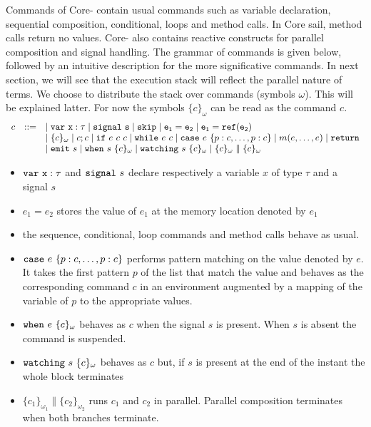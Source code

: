 \documentclass[12pt]{article}
\def\sig{s}
\def\signal{{\tt{signal}}}
\def\variable{\tt{var}}
\def\allocate{{\tt{ref}}}
\def\case{{\tt{case}}}
\newcommand{\ite}[3]{{\tt{if}}~#1~#2~#3}
\newcommand{\while}[2]{{\tt{while}}~#1~#2}
\def\emit{{\tt{emit}}}
\newcommand{\when}[2]{{\tt{when}}~#1~#2}
\newcommand{\watching}[2]{{\tt{watching}}~#1~#2}
\def\sail{{\sc{sail}}}
\def\skipp{{\tt{skip}}}
\def\return{{\tt{return}}}
\newcommand{\block}[2]{\{#1\}_{#2}}
\begin{document}
Commands of Core-\sail{} contain usual commands such as variable declaration, sequential composition, 
conditional, loops and method calls. In Core sail, method calls return no values.
Core-\sail{} also contains reactive constructs for parallel composition and signal handling.
The grammar of commands is given below, followed by an intuitive description for the more significative commands.
In next section, we will see that the execution stack will reflect the parallel nature of terms. We choose
to distribute the stack over commands (symbols $\omega$). This will be explained latter.
For now the symbols $\{c\}_\omega$ can be read as the command $c$.
$$
\begin{array}{lcl}
  c &::=& \mid \variable~x:\tau \mid \signal~\sig \mid \skipp \mid e_1 = e_2 \mid e_1 = \allocate(e_2) \\
  && \mid \{c\}_\omega \mid c;c \mid \ite{e}{c}{c} \mid \while{e}{c} \mid \case~e~\{p:c,\ldots,p:c\}
  \mid m(e,\ldots,e) \mid \return
   \\
  &&\mid \emit~s \mid \when{s}{\{c\}_\omega} \mid \watching{s}{\{c\}_\omega} 
  \mid \block{c}{\omega} \parallel \block{c}{\omega}
\end{array}
$$
\begin{itemize}
  \item $\variable~x:\tau$ and $\signal~s$ declare respectively a variable $x$ 
  of type $\tau$ and a signal $s$
  \item $e_1 = e_2$ stores the value of $e_1$ at the memory location denoted by $e_1$
  \item the sequence, conditional, loop commands and method calls behave as usual.
  \item $\case~e~\{p:c,\ldots,p:c\}$ performs pattern matching on the value denoted by 
  $e$. It takes the first pattern $p$ of the list that match the value and behaves as the
  corresponding command $c$ in an environment augmented by a mapping of the variable of $p$
  to the appropriate values. 
  \item $\when{e}{\block{c}{\omega}}$ behaves as $c$ when the signal $s$ is present. When $s$ is absent the 
  command is suspended.
  \item $\watching{s}{\block{c}{\omega}}$ behaves as $c$ but, if $s$ is present at the end of the instant the 
  whole block terminates
  \item $\block{c_1}{\omega_1} \parallel \block{c_2}{\omega_2}$ runs $c_1$ and $c_2$ in parallel. 
  Parallel composition terminates when both branches terminate.
\end{itemize}
\end{document}
